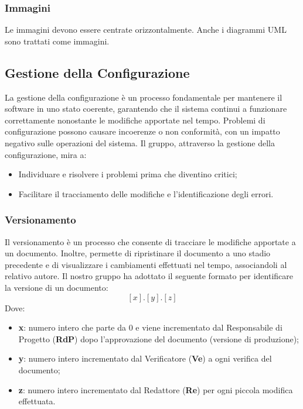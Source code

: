 \subsubsection{Immagini}
Le immagini devono essere centrate orizzontalmente. Anche i diagrammi UML sono trattati come immagini.










\subsection{Gestione della Configurazione}
La gestione della configurazione è un processo fondamentale per mantenere il software in uno stato coerente, 
garantendo che il sistema continui a funzionare correttamente nonostante le modifiche apportate nel tempo.
Problemi di configurazione possono causare incoerenze o non conformità, con un impatto negativo sulle operazioni del sistema.
Il gruppo, attraverso la gestione della configurazione, mira a:
\begin{itemize}
    \item Individuare e risolvere i problemi prima che diventino critici;
    \item Facilitare il tracciamento delle modifiche e l’identificazione degli errori.
\end{itemize}

\subsubsection{Versionamento}
Il versionamento è un processo che consente di tracciare le modifiche apportate a un documento. 
Inoltre, permette di ripristinare il documento a uno stadio precedente e di visualizzare i cambiamenti effettuati nel tempo, 
associandoli al relativo autore.
Il nostro gruppo ha adottato il seguente formato per identificare la versione di un documento:  
\[
[x].[y].[z]
\]
Dove:
\begin{itemize}
    \item \textbf{x}: numero intero che parte da 0 e viene incrementato dal Responsabile di Progetto (\textbf{RdP}) dopo l'approvazione del documento (versione di produzione);
    \item \textbf{y}: numero intero incrementato dal Verificatore (\textbf{Ve}) a ogni verifica del documento;
    \item \textbf{z}: numero intero incrementato dal Redattore (\textbf{Re}) per ogni piccola modifica effettuata.
\end{itemize}

